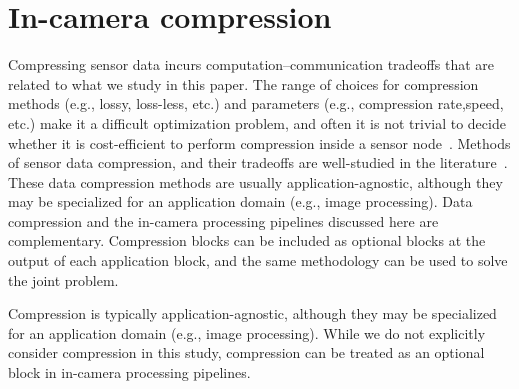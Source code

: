 \section{In-camera compression}\label{sec:compression-related-work}
Compressing sensor data incurs computation--communication tradeoffs that are related to what we study in this paper.
The range of choices for compression methods (e.g., lossy, loss-less, etc.) and parameters (e.g., compression rate,speed, etc.) make it a difficult optimization problem, and often it is not trivial to decide whether it is cost-efficient to perform compression inside a sensor node~\cite{zordan-compression}.
Methods of sensor data compression, and their tradeoffs are well-studied in the literature~\cite{vanderbyl-compression}.
These data compression methods are usually application-agnostic, although they may be specialized for an application domain (e.g., image processing).
Data compression and the in-camera processing pipelines discussed here are complementary. Compression blocks can be included as optional blocks at the output of each application block, and the same methodology can be used to solve the joint problem.


Compression is typically application-agnostic, although they may be specialized for an application domain (e.g., image processing).
While we do not explicitly consider compression in this study, compression can be treated as an optional block in in-camera processing pipelines.
